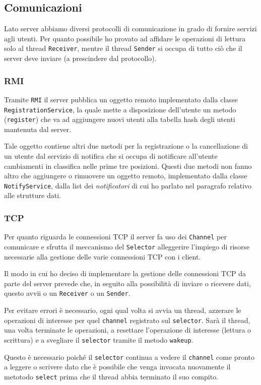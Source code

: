 \subsection{Comunicazioni}
Lato server abbiamo diversi protocolli di comunicazione in grado di fornire servizi agli utenti.
Per quanto possibile ho provato ad affidare le operazioni di lettura solo al thread \verb|Receiver|,
mentre il thread \verb|Sender| si occupa di tutto ciò che il server deve inviare (a prescindere
dal protocollo).

\subsubsection{RMI}
Tramite \verb|RMI| il server pubblica un oggetto remoto implementato dalla classe
\verb|RegistrationService|, la quale mette a disposizione dell'utente un metodo (\verb|register|)
che va ad aggiungere nuovi utenti alla tabella hash degli utenti mantenuta dal server.

Tale oggetto contiene altri due metodi per la registrazione o la cancellazione di un utente dal
servizio di notifica che si occupa di notificare all'utente cambiamenti in classifica nelle prime
tre posizioni. Questi due metodi non fanno altro che aggiungere o rimuovere un oggetto remoto,
implementato dalla classe \verb|NotifyService|, dalla list dei \emph{notificatori} di cui ho
parlato nel paragrafo relativo alle strutture dati.

\subsubsection{TCP}
Per quanto riguarda le connessioni TCP il server fa uso dei \verb|Channel| per comunicare e sfrutta
il meccanismo del \verb|Selector| alleggerire l'impiego di risorse necessarie alla gestione delle
varie connessioni TCP con i client.

Il modo in cui ho deciso di implementare la gestione delle connessioni TCP da parte del server
prevede che, in seguito alla possibilità di inviare o ricevere dati, questo avvii o un
\verb|Receiver| o un \verb|Sender|.

Per evitare errori è necessario, ogni qual volta si avvia un thread, azzerare le operazioni di
interesse per quel \verb|channel| registrato sul \verb|selector|. Sarà il thread, una volta
terminate le operazioni, a resettare l'operazione di interesse (lettura o scrittura) e a svegliare
il \verb|selector| tramite il metodo \verb|wakeup|.

Questo è necessario poiché il \verb|selector| continua a vedere il \verb|channel| come pronto a
leggere o scrivere dato che è possibile che venga invocata nuovamente il metotodo \verb|select|
prima che il thread abbia terminato il suo compito.

